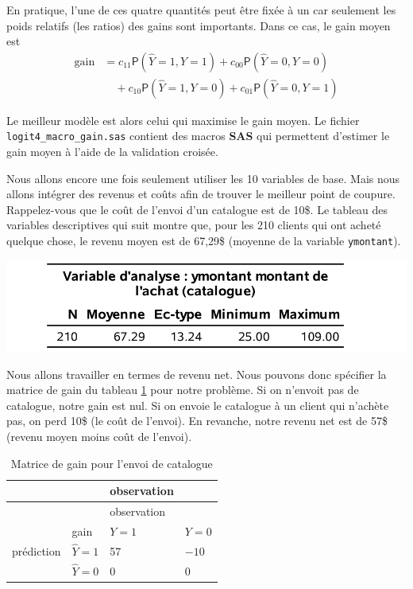 \documentclass[
  11pt,
  letterpaper,
]{book}
\theoremstyle{definition}
\theoremstyle{definition}
\theoremstyle{definition}
\theoremstyle{remark}
\begin{document}
En pratique, l'une de ces quatre quantités peut être fixée à un car seulement les poids relatifs (les ratios) des gains sont importants. Dans ce cas, le gain moyen est
\begin{align*}
\text{gain} &= c_{11} {\mathsf P}\left(\widehat{Y}=1, Y=1\right) + c_{00}{\mathsf P}\left(\widehat{Y}=0, Y=0\right) 
\\ &\quad + c_{10} {\mathsf P}\left(\widehat{Y}=1, Y=0\right)  + c_{01} {\mathsf P}\left(\widehat{Y}=0, Y=1\right)
\end{align*}

Le meilleur modèle est alors celui qui maximise le gain moyen. Le fichier \texttt{logit4\_macro\_gain.sas} contient des macros \textbf{SAS} qui permettent d'estimer le gain moyen à l'aide de la validation croisée.

Nous allons encore une fois seulement utiliser les 10 variables de base. Mais nous allons intégrer des revenus et coûts afin de trouver le meilleur point de coupure. Rappelez-vous que le coût de l'envoi d'un catalogue est de 10\$. Le tableau des variables descriptives qui suit montre que, pour les 210 clients qui ont acheté quelque chose, le revenu moyen est de 67,29\$ (moyenne de la variable \texttt{ymontant}).

\begin{center}\includegraphics[width=0.6\linewidth]{figures/03-logistic-e18} \end{center}

Nous allons travailler en termes de revenu net. Nous pouvons donc spécifier la matrice de gain du tableau \ref{tab:03-gain3} pour notre problème. Si on n'envoit pas de catalogue, notre gain est nul. Si on envoie le catalogue à un client qui n'achète pas, on perd 10\$ (le coût de l'envoi). En revanche, notre revenu net est de 57\$ (revenu moyen moins coût de l'envoi).

\begin{longtable}[]{@{}llll@{}}
\caption{\label{tab:03-gain3} Matrice de gain pour l'envoi de catalogue}\tabularnewline
\toprule
& & observation & \\
\midrule
\endfirsthead
\toprule
& & observation & \\
\midrule
\endhead
& gain & \(Y=1\) & \(Y=0\) \\
prédiction & \(\widehat{Y}=1\) & 57 & \(-10\) \\
& \(\widehat{Y}=0\) & 0 & 0 \\
\bottomrule
\end{longtable}
\end{document}
